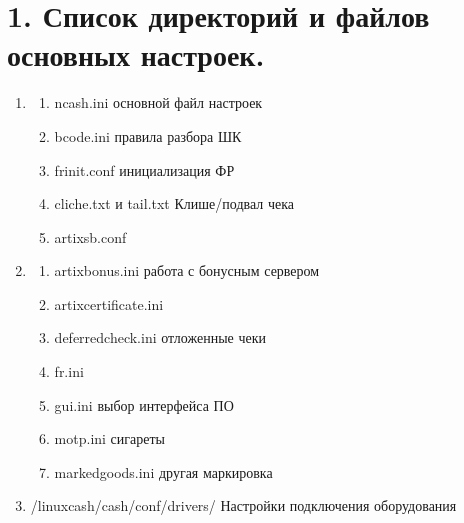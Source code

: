 \documentclass[a4paper,10pt,russian]{report}
\begin{document}
\section{1. Список директорий и файлов  основных настроек.}
\label{\detokenize{additional:id2}}\begin{enumerate}
%
\item {} \begin{description}
\begin{enumerate}
%
\item {} 
\sphinxAtStartPar
ncash.ini \sphinxhyphen{} основной файл настроек

\item {} 
\sphinxAtStartPar
bcode.ini  \sphinxhyphen{} правила разбора ШК

\item {} 
\sphinxAtStartPar
frinit.conf \sphinxhyphen{} инициализация ФР

\item {} 
\sphinxAtStartPar
cliche.txt и tail.txt \sphinxhyphen{} Клише/подвал чека

\item {} 
\sphinxAtStartPar
artixsb.conf

\end{enumerate}

\end{description}

\item {} \begin{description}
\begin{enumerate}
%
\item {} 
\sphinxAtStartPar
artixbonus.ini \sphinxhyphen{} работа с бонусным сервером

\item {} 
\sphinxAtStartPar
artixcertificate.ini

\item {} 
\sphinxAtStartPar
deferredcheck.ini \sphinxhyphen{} отложенные чеки

\item {} 
\sphinxAtStartPar
fr.ini

\item {} 
\sphinxAtStartPar
gui.ini \sphinxhyphen{} выбор интерфейса ПО

\item {} 
\sphinxAtStartPar
motp.ini \sphinxhyphen{} сигареты

\item {} 
\sphinxAtStartPar
markedgoods.ini \sphinxhyphen{} другая маркировка

\end{enumerate}

\end{description}

\item {} 
\sphinxAtStartPar
/linuxcash/cash/conf/drivers/ \sphinxhyphen{} Настройки подключения оборудования

\end{enumerate}
\end{document}
